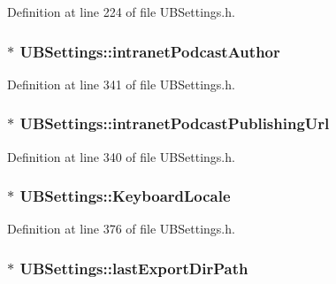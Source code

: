 Definition at line 224 of file U\-B\-Settings.\-h.

\hypertarget{class_u_b_settings_a892b406d947337b92a2590fb638f4730}{
\subsubsection[{intranet\-Podcast\-Author}]{$\ast$ U\-B\-Settings\-::intranet\-Podcast\-Author}}\label{db/d66/class_u_b_settings_a892b406d947337b92a2590fb638f4730}


Definition at line 341 of file U\-B\-Settings.\-h.

\hypertarget{class_u_b_settings_a999bfab8413c0310904a2ea0584104e8}{
\subsubsection[{intranet\-Podcast\-Publishing\-Url}]{$\ast$ U\-B\-Settings\-::intranet\-Podcast\-Publishing\-Url}}\label{db/d66/class_u_b_settings_a999bfab8413c0310904a2ea0584104e8}


Definition at line 340 of file U\-B\-Settings.\-h.

\hypertarget{class_u_b_settings_af8fe40526842d1417407512372516df3}{
\subsubsection[{Keyboard\-Locale}]{$\ast$ U\-B\-Settings\-::\-Keyboard\-Locale}}\label{db/d66/class_u_b_settings_af8fe40526842d1417407512372516df3}


Definition at line 376 of file U\-B\-Settings.\-h.

\hypertarget{class_u_b_settings_adb4eebdbd8f10570191b00dab66f76ca}{
\subsubsection[{last\-Export\-Dir\-Path}]{$\ast$ U\-B\-Settings\-::last\-Export\-Dir\-Path}}\label{db/d66/class_u_b_settings_adb4eebdbd8f10570191b00dab66f76ca}



